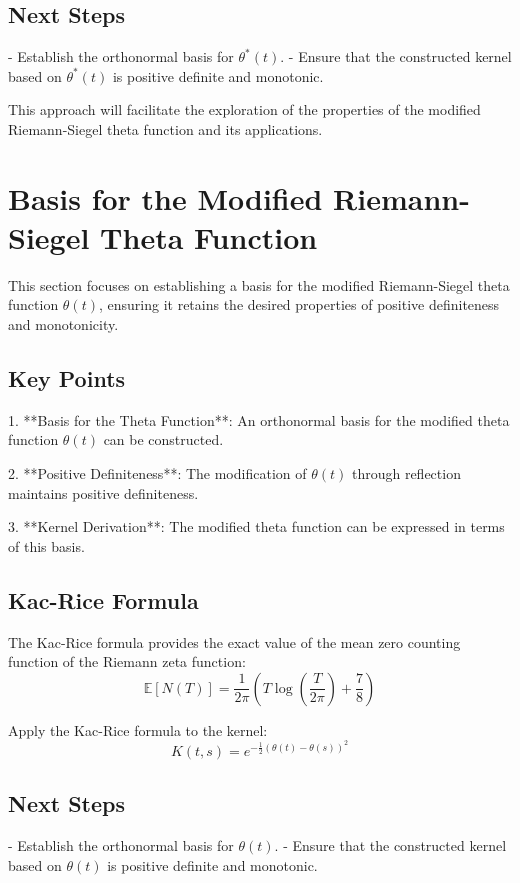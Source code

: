 \documentclass{article}
\begin{document}
\subsection{Next Steps}
- Establish the orthonormal basis for $\theta^*(t)$.
- Ensure that the constructed kernel based on $\theta^*(t)$ is positive definite and monotonic.

This approach will facilitate the exploration of the properties of the modified Riemann-Siegel theta function and its applications.

\section{Basis for the Modified Riemann-Siegel Theta Function}

This section focuses on establishing a basis for the modified Riemann-Siegel theta function $\theta(t)$, ensuring it retains the desired properties of positive definiteness and monotonicity.

\subsection{Key Points}
1. **Basis for the Theta Function**: An orthonormal basis for the modified theta function $\theta(t)$ can be constructed.

2. **Positive Definiteness**: The modification of $\theta(t)$ through reflection maintains positive definiteness.

3. **Kernel Derivation**: The modified theta function can be expressed in terms of this basis.

\subsection{Kac-Rice Formula}
The Kac-Rice formula provides the exact value of the mean zero counting function of the Riemann zeta function:
$$ \mathbb{E}[N(T)] = \frac{1}{2\pi} \left( T \log\left(\frac{T}{2\pi}\right) + \frac{7}{8} \right) $$

Apply the Kac-Rice formula to the kernel:
$$ K(t, s) = e^{-\frac{1}{2}(\theta(t) - \theta(s))^2} $$

\subsection{Next Steps}
- Establish the orthonormal basis for $\theta(t)$.
- Ensure that the constructed kernel based on $\theta(t)$ is positive definite and monotonic.
\end{document}
